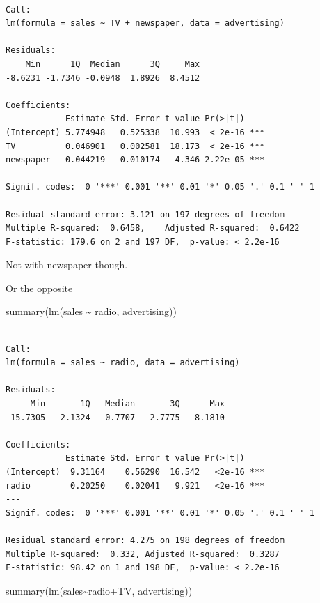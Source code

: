 \documentclass[
  letterpaper,
  DIV=11,
  numbers=noendperiod]{scrreprt}
\newenvironment{Shaded}{\begin{snugshade}}{\end{snugshade}}
\newcommand{\FunctionTok}[1]{\textcolor[rgb]{0.02,0.16,0.49}{#1}}
\newcommand{\NormalTok}[1]{\textcolor[rgb]{0.33,0.33,0.33}{#1}}
\newcommand{\SpecialCharTok}[1]{\textcolor[rgb]{0.00,0.46,0.62}{#1}}
\begin{document}
\begin{verbatim}

Call:
lm(formula = sales ~ TV + newspaper, data = advertising)

Residuals:
    Min      1Q  Median      3Q     Max 
-8.6231 -1.7346 -0.0948  1.8926  8.4512 

Coefficients:
            Estimate Std. Error t value Pr(>|t|)    
(Intercept) 5.774948   0.525338  10.993  < 2e-16 ***
TV          0.046901   0.002581  18.173  < 2e-16 ***
newspaper   0.044219   0.010174   4.346 2.22e-05 ***
---
Signif. codes:  0 '***' 0.001 '**' 0.01 '*' 0.05 '.' 0.1 ' ' 1

Residual standard error: 3.121 on 197 degrees of freedom
Multiple R-squared:  0.6458,    Adjusted R-squared:  0.6422 
F-statistic: 179.6 on 2 and 197 DF,  p-value: < 2.2e-16
\end{verbatim}

Not with newspaper though.

Or the opposite

\begin{Shaded}
\begin{Highlighting}[]
\FunctionTok{summary}\NormalTok{(}\FunctionTok{lm}\NormalTok{(sales }\SpecialCharTok{\textasciitilde{}}\NormalTok{ radio, advertising))}
\end{Highlighting}
\end{Shaded}

\begin{verbatim}

Call:
lm(formula = sales ~ radio, data = advertising)

Residuals:
     Min       1Q   Median       3Q      Max 
-15.7305  -2.1324   0.7707   2.7775   8.1810 

Coefficients:
            Estimate Std. Error t value Pr(>|t|)    
(Intercept)  9.31164    0.56290  16.542   <2e-16 ***
radio        0.20250    0.02041   9.921   <2e-16 ***
---
Signif. codes:  0 '***' 0.001 '**' 0.01 '*' 0.05 '.' 0.1 ' ' 1

Residual standard error: 4.275 on 198 degrees of freedom
Multiple R-squared:  0.332, Adjusted R-squared:  0.3287 
F-statistic: 98.42 on 1 and 198 DF,  p-value: < 2.2e-16
\end{verbatim}

\begin{Shaded}
\begin{Highlighting}[]
\FunctionTok{summary}\NormalTok{(}\FunctionTok{lm}\NormalTok{(sales}\SpecialCharTok{\textasciitilde{}}\NormalTok{radio}\SpecialCharTok{+}\NormalTok{TV, advertising))}
\end{Highlighting}
\end{Shaded}
\end{document}
